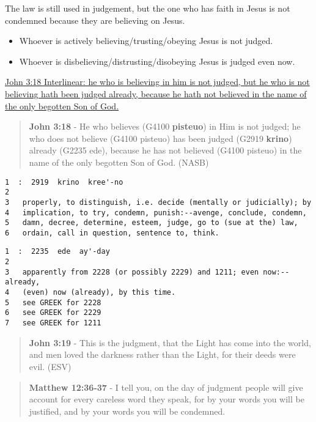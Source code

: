 \documentclass[11pt]{article}
\begin{document}
The law is still used in judgement, but the one who has faith in Jesus is not condemned because they are believing on Jesus.

\begin{itemize}
\item Whoever is actively believing/trusting/obeying Jesus is not judged.
\item Whoever is disbelieving/distrusting/disobeying Jesus is judged even now.
\end{itemize}

\href{https://biblehub.com/interlinear/john/3-18.htm}{John 3:18 Interlinear: he who is believing in him is not judged, but he who is not believing hath been judged already, because he hath not believed in the name of the only begotten Son of God.}

\begin{quote}
\textbf{John 3:18} - He who believes (G4100 \textbf{pisteuo}) in Him is not judged; he who does not believe (G4100 pisteuo) has been judged (G2919 \textbf{krino}) already (G2235 ede), because he has not believed (G4100 pisteuo) in the name of the only begotten Son of God. (NASB)
\end{quote}

\begin{verbatim}
1  :  2919  krino  kree'-no
2  
3   properly, to distinguish, i.e. decide (mentally or judicially); by
4   implication, to try, condemn, punish:--avenge, conclude, condemn,
5   damn, decree, determine, esteem, judge, go to (sue at the) law,
6   ordain, call in question, sentence to, think.
\end{verbatim}

\begin{verbatim}
1  :  2235  ede  ay'-day
2  
3   apparently from 2228 (or possibly 2229) and 1211; even now:--already,
4   (even) now (already), by this time.
5   see GREEK for 2228
6   see GREEK for 2229
7   see GREEK for 1211
\end{verbatim}

\begin{quote}
\textbf{John 3:19} - This is the judgment, that the Light has come into the world, and men loved the darkness rather than the Light, for their deeds were evil. (ESV)
\end{quote}

\begin{quote}
\textbf{Matthew 12:36-37} - I tell you, on the day of judgment people will give account for every careless word they speak, for by your words you will be justified, and by your words you will be condemned.
\end{quote}
\end{document}
